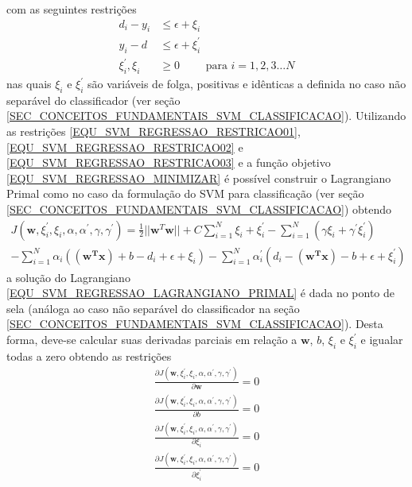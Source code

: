 com as seguintes restrições
\begin{align}
d_{i} - y_{i} &\leq \epsilon + \xi_{i}					 \label{EQU_SVM_REGRESSAO_RESTRICAO01} 		\\
y_{i} - d  &\leq \epsilon + \xi_{i}^{'}			 \label{EQU_SVM_REGRESSAO_RESTRICAO02} 		\\
\xi_{i}^{'}, \xi_{i} &\geq 0 \qquad \textrm{ para } i =1, 2, 3 \ldots N \label{EQU_SVM_REGRESSAO_RESTRICAO03}
\end{align}
nas quais \(\xi_{i}\) e \(\xi_{i}^{'}\) são variáveis de folga, positivas e idênticas a definida no caso não separável do classificador (ver seção \ref{SEC_CONCEITOS_FUNDAMENTAIS_SVM_CLASSIFICACAO}). Utilizando as restrições \eqref{EQU_SVM_REGRESSAO_RESTRICAO01}, \eqref{EQU_SVM_REGRESSAO_RESTRICAO02} e \eqref{EQU_SVM_REGRESSAO_RESTRICAO03} e a função objetivo \eqref{EQU_SVM_REGRESSAO_MINIMIZAR} é possível construir o Lagrangiano Primal como no caso da formulação do SVM para classificação (ver seção \ref{SEC_CONCEITOS_FUNDAMENTAIS_SVM_CLASSIFICACAO}) \cite{Haykin2007} obtendo
\begin{align}
\nonumber J(\mathbf{w}, \xi_{i}^{'}, \xi_{i}, \alpha, \alpha^{'}, \gamma, \gamma^{'}) = \frac{1}{2}||\mathbf{w}^{T}\mathbf{w}|| + C \sum\limits_{i=1}^{N} \xi_{i} + \xi_{i}^{'} - \sum\limits_{i=1}^{N} ( \gamma\xi_{i} + \gamma^{'}\xi_{i}^{'} ) \\
-\sum\limits_{i=1}^{N}\alpha_{i}((\mathbf{w^{T}x}) + b - d_{i}+ \epsilon + \xi_{i}) - \sum\limits_{i=1}^{N}\alpha_{i}^{'}(d_{i} - (\mathbf{w^{T}x}) - b + \epsilon + \xi_{i}^{'}) \label{EQU_SVM_REGRESSAO_LAGRANGIANO_PRIMAL}
\end{align}
a solução do Lagrangiano \eqref{EQU_SVM_REGRESSAO_LAGRANGIANO_PRIMAL} é dada no ponto de sela (análoga ao caso não separável do classificador na seção \ref{SEC_CONCEITOS_FUNDAMENTAIS_SVM_CLASSIFICACAO}). Desta forma, deve-se calcular suas derivadas parciais em relação a \(\mathbf{w}\), \(b\), \(\xi_{i}\) e \(\xi_{i}^{'}\) e igualar todas a zero \cite{Haykin2007} obtendo as restrições
\begin{align}
\frac{\partial J(\mathbf{w}, \xi_{i}^{'}, \xi_{i}, \alpha, \alpha^{'}, \gamma, \gamma^{'})}{\partial \mathbf{w}} = 0	\label{EQU_SVM_REGRESSAO_PONTO_SELA_W}\\
\frac{\partial J(\mathbf{w}, \xi_{i}^{'}, \xi_{i}, \alpha, \alpha^{'}, \gamma, \gamma^{'})}{\partial b} = 0  	\label{EQU_SVM_REGRESSAO_PONTO_SELA_B}\\
\frac{\partial J(\mathbf{w}, \xi_{i}^{'}, \xi_{i}, \alpha, \alpha^{'}, \gamma, \gamma^{'})}{\partial \xi_{i}} = 0	\label{EQU_SVM_REGRESSAO_PONTO_SELA_XI}\\
\frac{\partial J(\mathbf{w}, \xi_{i}^{'}, \xi_{i}, \alpha, \alpha^{'}, \gamma, \gamma^{'})}{\partial \xi_{i}^{'}} = 0  	\label{EQU_SVM_REGRESSAO_PONTO_SELA_XI_LINHA}
\end{align}
